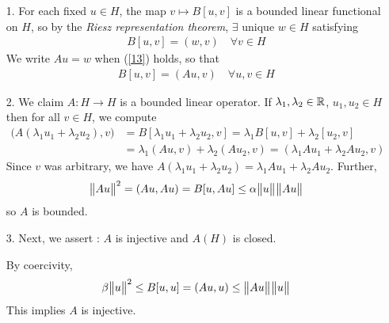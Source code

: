 \documentclass[12pt,a4paper]{report}
\newenvironment{proof}
{\begin{changemargin}{1cm}{0.5cm} 
	}%
	{\end{changemargin}
}
\newenvironment{subproof}
{\begin{changemargin}{0.5cm}{0.5cm} 
	}%
	{\end{changemargin}
}
\begin{document}
\begin{proof}
\pf \begin{itemize}
\item[1.] For each fixed $u\in H$, the map $v\mapsto B[u,v]$ is a bounded linear functional on $H$, so by the \emph{Riesz representation theorem}, $\exists$ unique $w\in H$ satisfying
\begin{align}
B[u,v] = (w, v) \quad \forall v \in H \label{13}
\end{align}
We write $Au =w$ when (\ref{13}) holds, so that
\begin{align*}
B[u,v] = (Au,v) \quad \forall u,v\in H
\end{align*}
\item[2.] We claim $A: H\rightarrow H$ is a bounded linear operator. If $\lambda_1, \lambda_2 \in \mathbb{R}$, $u_1, u_2 \in H$ then for all $v\in H$, we compute
\begin{align*}
\big( A(\lambda_1 u_1 + \lambda_2 u_2), v \big) &= B[\lambda_1 u_1 + \lambda_2 u_2, v] = \lambda_1 B[u,v] + \lambda_2[u_2,v] \\
& = \lambda_1(Au,v) + \lambda_2 (Au_2, v) = (\lambda_1 Au_1 + \lambda_2 Au_2, v)
\end{align*}
Since $v$ was arbitrary, we have $A(\lambda_1 u_1 + \lambda_2 u_2) = \lambda_1 A u_1 + \lambda_2 Au_2$. Further,
\begin{align*}
\bigl\lVert A u\bigr\rVert_{}^2 = (Au, Au) = B[u,Au] \leq \alpha \bigl\lVert u\bigr\rVert_{} \bigl\lVert Au\bigr\rVert_{}
\end{align*}
so $A$ is bounded.
\item[3.] Next, we assert : $A$ is injective and $A(H)$ is closed.
\begin{subproof}
\pf By coercivity, 
\begin{align*}
\beta \bigl\lVert u\bigr\rVert_{}^2 \leq B[u,u] = (Au,u) \leq \bigl\lVert Au\bigr\rVert_{} \bigl\lVert u\bigr\rVert_{}
\end{align*}
This implies $A$ is injective.


\end{subproof}
\end{itemize}
\end{proof}
\end{document}
